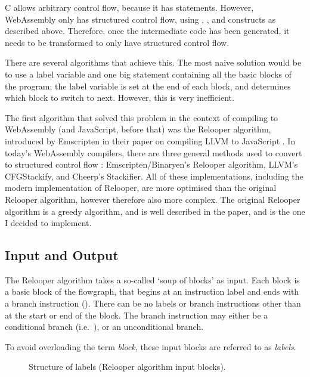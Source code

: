 \documentclass[00-main.tex]{subfiles}
\begin{document}
C allows arbitrary control flow, because it has  statements.
However, WebAssembly only has structured control flow, using , , and  constructs as described above.
Therefore, once the intermediate code has been generated, it needs to be transformed to only have structured control flow.

There are several algorithms that achieve this.
The most naive solution would be to use a label variable and one big  statement containing all the basic blocks of the program; the label variable is set at the end of each block, and determines which block to switch to next. However, this is very inefficient.

The first algorithm that solved this problem in the context of compiling to WebAssembly (and JavaScript, before that) was the Relooper algorithm, introduced by Emscripten in their paper on compiling LLVM to JavaScript .
In today's WebAssembly compilers, there are three general methods used to convert to structured control flow : Emscripten/Binaryen's Relooper algorithm, LLVM's CFGStackify, and Cheerp's Stackifier.
All of these implementations, including the modern implementation of Relooper, are more optimised than the original Relooper algorithm, however therefore also more complex.
The original Relooper algorithm is a greedy algorithm, and is well described in the paper, and is the one I decided to implement.

\subsection{Input and Output}

The Relooper algorithm takes a so-called `soup of blocks' as input.
Each block is a basic block of the flowgraph, that begins at an instruction label and ends with a branch instruction ().
There can be no labels or branch instructions other than at the start or end of the block.
The branch instruction may either be a conditional branch (i.e.\ ), or an unconditional branch.

To avoid overloading the term \emph{block}, these input blocks are referred to as \emph{labels}.


\begin{figure}[ht]
  \centering
  \caption{Structure of labels (Relooper algorithm input blocks).}
  \label{fig:relooper input label structure}
\end{figure}
\end{document}
